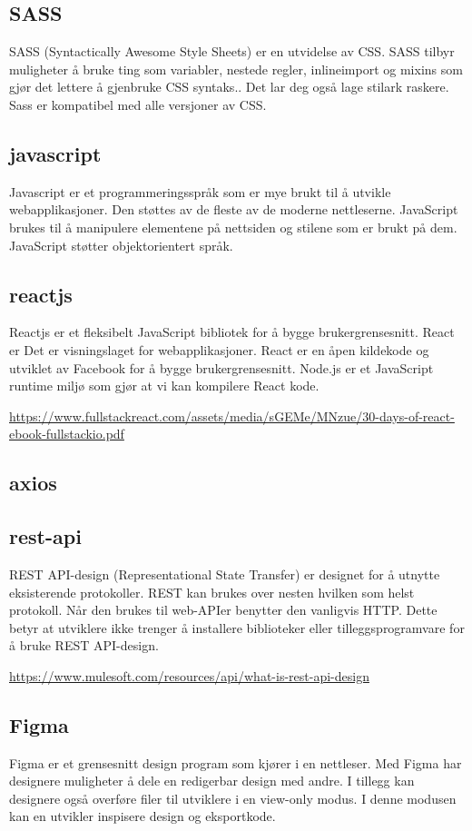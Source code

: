 \subsection{SASS}
SASS (Syntactically Awesome Style Sheets) er en utvidelse av CSS. SASS tilbyr muligheter å bruke ting som variabler, nestede regler, inlineimport og mixins som gjør det lettere å gjenbruke CSS syntaks.. Det lar deg også lage stilark raskere. Sass er kompatibel med alle versjoner av CSS.  

\subsection{javascript}
Javascript er et programmeringsspråk som er mye brukt til å utvikle webapplikasjoner. Den støttes av de fleste av de moderne nettleserne. JavaScript brukes til å manipulere elementene på nettsiden og stilene som er brukt på dem. JavaScript støtter objektorientert språk.

\subsection{reactjs}
Reactjs er et fleksibelt JavaScript bibliotek for å bygge brukergrensesnitt. React er Det er visningslaget for webapplikasjoner. React er en åpen kildekode og utviklet av Facebook for å bygge brukergrensesnitt. Node.js er et JavaScript runtime miljø som gjør at vi kan kompilere React kode.

\url{https://www.fullstackreact.com/assets/media/sGEMe/MNzue/30-days-of-react-ebook-fullstackio.pdf}

\subsection{axios}

\subsection{rest-api}
REST API-design (Representational State Transfer) er designet for å utnytte eksisterende protokoller. REST kan brukes over nesten hvilken som helst protokoll. Når den brukes til web-APIer benytter den vanligvis HTTP. Dette betyr at utviklere ikke trenger å installere biblioteker eller tilleggsprogramvare for å bruke REST API-design.

\url{https://www.mulesoft.com/resources/api/what-is-rest-api-design}

\subsection{Figma}
Figma er et grensesnitt design program som kjører i en nettleser. Med Figma har designere muligheter å dele en redigerbar design med andre. I tillegg kan designere også overføre filer til utviklere i en view-only modus. I denne modusen kan en utvikler inspisere design og eksportkode.

